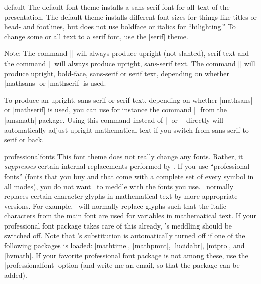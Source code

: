 \begin{fontthemeexample}{default}
  The default font theme installs a sans serif font for all text of
  the presentation. The default theme installs different font sizes
  for things like titles or head- and footlines, but does not use
  boldface or italics for ``hilighting.'' To change some or all text
  to a serif font, use the |serif| theme.

  Note: The command |\mathrm| will always produce upright (not
  slanted), serif text and the command |\mathsf| will always produce
  upright, sans-serif text. The command |\mathbf| will produce
  upright, bold-face, sans-serif or serif text, depending on whether
  |mathsans| or |mathserif| is used.

  To produce an upright, sans-serif or serif text, depending on
  whether |mathsans| or |mathserif| is used, you can use for instance
  the command |\operatorname| from the |amsmath| package. Using this
  command instead of |\mathrm| or |\mathsf| directly will
  automatically adjust  upright mathematical text if you switch from
  sans-serif to serif or back.
\end{fontthemeexample}

\begin{fontthemeexample*}{professionalfonts}
  This font theme does not really change any fonts. Rather, it
  \emph{suppresses} certain internal replacements performed by
  \beamer. If you use ``professional fonts'' (fonts that you buy and
  that come with a complete set of every symbol in all modes), you do
  not want \beamer\ to meddle with the fonts you use.  \beamer\
  normally replaces certain character glyphs in mathematical text by
  more appropriate versions. For example, \beamer\ will normally
  replace glyphs such that the italic characters from the main font
  are used for variables in mathematical text. If your professional
  font package takes care of this already, \beamer's meddling should
  be switched off. Note that \beamer's substitution is automatically
  turned off if one of the following packages is loaded: |mathtime|,
  |mathpmnt|, |lucidabr|, |mtpro|, and |hvmath|. If your favorite
  professional font package is not among these, use the
  |professionalfont| option (and write me an email, so that the
  package can be added).
\end{fontthemeexample*}



